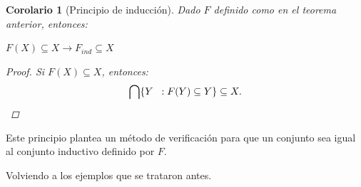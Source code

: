 \documentclass[11pt,oneside]{report}
\theoremstyle{plain}
\newtheorem{coro}{Corolario}[chapter]
\theoremstyle{definition}
\begin{document}
\begin{coro}[Principio de inducción]
    Dado $F$ definido como en el teorema anterior, entonces:
    \begin{center}
        $F(X)\subseteq X \rightarrow F_{ind}\subseteq X$\\
    \end{center}
    \begin{proof}
        Si $F(X)\subseteq X$, entonces:
        $$\bigcap \{Y \hspace{2mm}:F(Y)\subseteq Y\} \subseteq X.$$
    \end{proof}
\end{coro}

Este principio plantea un método de verificación para que un conjunto sea igual al conjunto inductivo definido por $F$. %

Volviendo a los ejemplos que se trataron antes.
\end{document}
